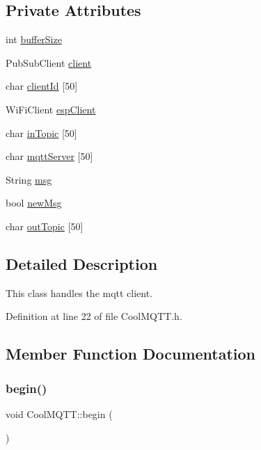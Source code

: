 \subsection*{Private Attributes}
\begin{DoxyCompactItemize}
\item 
int \hyperlink{classCoolMQTT_a7f3cf26b51d6770f216e42c5ef13ca9f}{buffer\+Size}
\item 
Pub\+Sub\+Client \hyperlink{classCoolMQTT_a4ca71e4f76ef868692a297efd45b1415}{client}
\item 
char \hyperlink{classCoolMQTT_af01bc6160c5a191e90df1b6e7318828d}{client\+Id} \mbox{[}50\mbox{]}
\item 
Wi\+Fi\+Client \hyperlink{classCoolMQTT_acc30a0200967374a524092a8a806502a}{esp\+Client}
\item 
char \hyperlink{classCoolMQTT_a4492f52a441e83cc5151010317fdb52d}{in\+Topic} \mbox{[}50\mbox{]}
\item 
char \hyperlink{classCoolMQTT_ab8bb951f87ddbf92db74c2ad16a3e53e}{mqtt\+Server} \mbox{[}50\mbox{]}
\item 
String \hyperlink{classCoolMQTT_af6b19e7074dbbb4ae493c44dcb53f7ff}{msg}
\item 
bool \hyperlink{classCoolMQTT_a3240388137b885775aadf38e96b24c6b}{new\+Msg}
\item 
char \hyperlink{classCoolMQTT_a109c786a17b463f9eeba046194279522}{out\+Topic} \mbox{[}50\mbox{]}
\end{DoxyCompactItemize}


\subsection{Detailed Description}
This class handles the mqtt client. 

Definition at line 22 of file Cool\+M\+Q\+T\+T.\+h.



\subsection{Member Function Documentation}
\mbox{\label{classCoolMQTT_ac9248808641ebf3054ed0620ea9d0100}} 
\subsubsection{\texorpdfstring{begin()}{begin()}}
{\footnotesize\ttfamily void Cool\+M\+Q\+T\+T\+::begin (\begin{DoxyParamCaption}{ }\end{DoxyParamCaption})}

